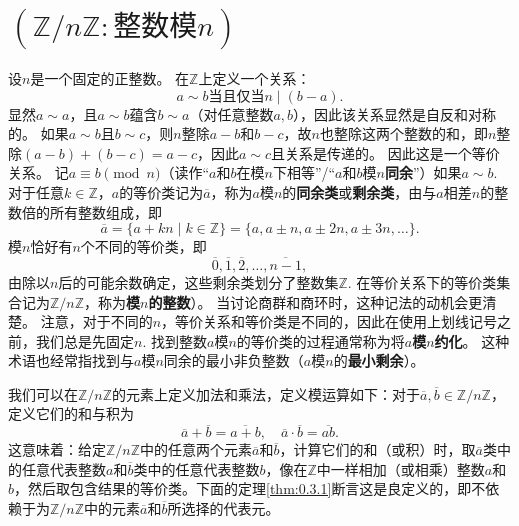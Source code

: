 \section{$(\mathbb{Z}/n\mathbb{Z} : \text{整数模}n)$}
设$n$是一个固定的正整数。
在$\mathbb{Z}$上定义一个关系：\[a \sim b \text{当且仅当} n \mid (b - a).\]
显然$a \sim a$，且$a \sim b$蕴含$b \sim a$（对任意整数$a, b$），因此该关系显然是自反和对称的。
如果$a \sim b$且$b \sim c$，则$n$整除$a - b$和$b - c$，故$n$也整除这两个整数的和，即$n$整除$(a - b) + (b - c) = a - c$，因此$a \sim c$且关系是传递的。
因此这是一个等价关系。
记$a \equiv b \pmod{n}$（读作“$a$和$b$在模$n$下相等”/“$a$和$b$模$n$\textbf{同余}”）如果$a \sim b$.
对于任意$k \in \mathbb{Z}$，$a$的等价类记为$\overline{a}$，称为$a$模$n$的\textbf{同余类}或\textbf{剩余类}，由与$a$相差$n$的整数倍的所有整数组成，即
\[
\overline{a} = \{a + kn \mid k \in \mathbb{Z}\} = \{a, a \pm n, a \pm 2n, a \pm 3n, \ldots\}.
\]
模$n$恰好有$n$个不同的等价类，即$$\overline{0}, \overline{1}, \overline{2}, \ldots, \overline{n-1},$$由除以$n$后的可能余数确定，这些剩余类划分了整数集$\mathbb{Z}$.
在等价关系下的等价类集合记为$\mathbb{Z}/n\mathbb{Z}$，称为\textbf{模$n$的整数}）。
当讨论商群和商环时，这种记法的动机会更清楚。
注意，对于不同的$n$，等价关系和等价类是不同的，因此在使用上划线记号之前，我们总是先固定$n$. 
找到整数$a$模$n$的等价类的过程通常称为将$a$\textbf{模$n$约化}。
这种术语也经常指找到与$a$模$n$同余的最小非负整数（$a$模$n$的\textbf{最小剩余}）。

我们可以在$\mathbb{Z}/n\mathbb{Z}$的元素上定义加法和乘法，定义模运算如下：对于$\overline{a}, \overline{b} \in \mathbb{Z}/n\mathbb{Z}$，定义它们的和与积为
\[
\overline{a} + \overline{b} = \overline{a + b}, \quad \overline{a} \cdot \overline{b} = \overline{ab}.
\]
这意味着：给定$\mathbb{Z}/n\mathbb{Z}$中的任意两个元素$\overline{a}$和$\overline{b}$，计算它们的和（或积）时，取$\overline{a}$类中的任意代表整数$a$和$\overline{b}$类中的任意代表整数$b$，像在$\mathbb{Z}$中一样相加（或相乘）整数$a$和$b$，然后取包含结果的等价类。下面的定理\ref{thm:0.3.1}断言这是良定义的，即不依赖于为$\mathbb{Z}/n\mathbb{Z}$中的元素$\overline{a}$和$\overline{b}$所选择的代表元。

